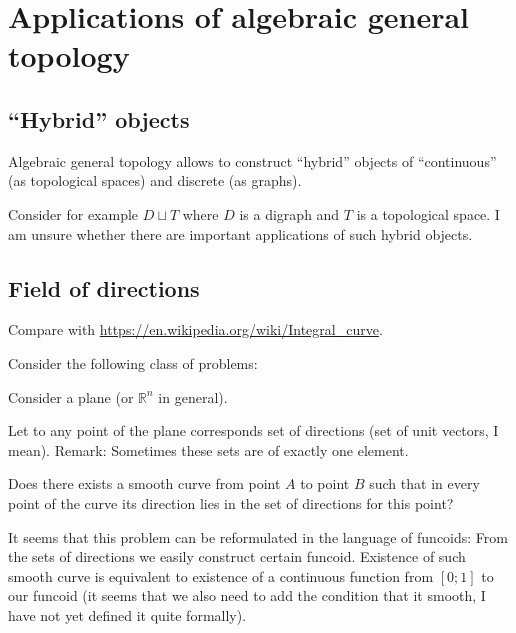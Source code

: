 \chapter{Applications of algebraic general topology}


\section{``Hybrid'' objects}

Algebraic general topology allows to construct ``hybrid'' objects of ``continuous'' (as topological spaces)
and discrete (as graphs).

Consider for example $D\sqcup T$ where $D$ is a digraph and $T$ is a topological space.
I am unsure whether there are important applications of such hybrid objects.

\section{Field of directions}


Compare with \url{https://en.wikipedia.org/wiki/Integral_curve}.

Consider the following class of problems:

Consider a plane (or $\mathbb{R}^n$ in general).

Let to any point of the plane corresponds set of directions (set of unit vectors, I mean). Remark: Sometimes these sets are of exactly one element.

Does there exists a smooth curve from point $A$ to point $B$ such that in every point of the curve its direction lies in the set of directions for this point?

It seems that this problem can be reformulated in the language of funcoids: From the sets of directions we easily construct certain funcoid.
Existence of such smooth curve is equivalent to existence of a continuous function from $[0;1]$ to our funcoid (it seems that we also need to add the
condition that it smooth, I have not yet defined it quite formally).

